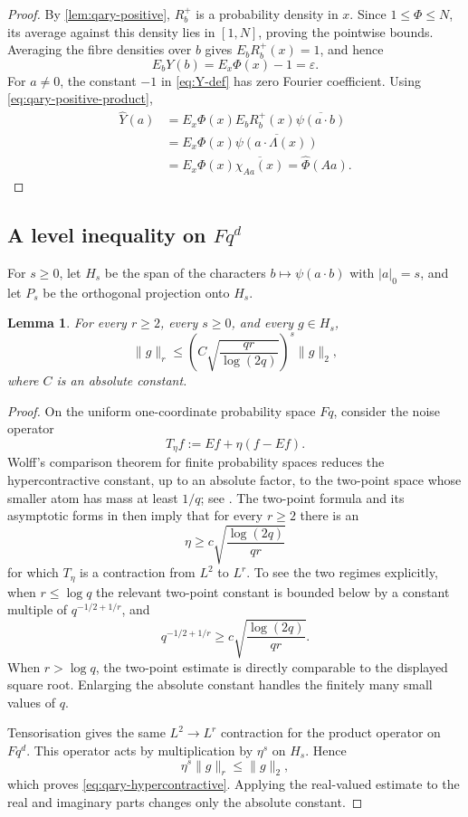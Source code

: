 \documentclass[11pt,reqno]{amsart}
\numberwithin{equation}{section}
\newtheorem{lemma}[lemma]{Lemma}
\theoremstyle{definition}
\theoremstyle{remark}
\newcommand{\Fq}{\mathbb F_q}
\newcommand{\E}{\mathbb E}
\newcommand{\eps}{\varepsilon}
\newcommand{\wh}{\widehat}
\newcommand{\norm}[1]{\lVert#1\rVert}
\def\Fq{Fq}%
\def\mathbb#1{#1}%
\begin{document}
\begin{proof}
By \cref{lem:qary-positive}, $R_b^+$ is a probability density in $x$.  Since $1\le\Phi\le N$, its average against this density lies in $[1,N]$, proving the pointwise bounds.  Averaging the fibre densities over $b$ gives
$\E_bR_b^+(x)=1$, and hence
\[
 \E_bY(b)=\E_x\Phi(x)-1=\eps.
\]
For $a\ne0$, the constant $-1$ in \eqref{eq:Y-def} has zero Fourier coefficient.  Using \eqref{eq:qary-positive-product},
\begin{align*}
 \wh Y(a)
 &=\E_x\Phi(x)
   \E_bR_b^+(x)\overline{\psi(a\cdot b)}\\
 &=\E_x\Phi(x)\overline{\psi(a\cdot\Lambda(x))}\\
 &=\E_x\Phi(x)\overline{\chi_{Aa}(x)}
 =\wh\Phi(Aa).
\end{align*}
\end{proof}

\subsection{A level inequality on $\Fq^d$}

For $s\ge0$, let $H_s$ be the span of the characters
$b\mapsto\psi(a\cdot b)$ with $|a|_0=s$, and let $P_s$ be the orthogonal projection onto $H_s$.

\begin{lemma}\label{lem:qary-hypercontractive}
For every $r\ge2$, every $s\ge0$, and every $g\in H_s$,
\begin{equation}\label{eq:qary-hypercontractive}
 \norm g_r
 \le
 \left(
   C\sqrt{\frac{qr}{\log(2q)}}
 \right)^s
 \norm g_2,
\end{equation}
where $C$ is an absolute constant.
\end{lemma}

\begin{proof}
On the uniform one-coordinate probability space $\Fq$, consider the noise operator
\[
 T_\eta f:=\E f+\eta(f-\E f).
\]
Wolff's comparison theorem for finite probability spaces reduces the hypercontractive constant, up to an absolute factor, to the two-point space whose smaller atom has mass at least $1/q$; see \cite[Theorem~3.1]{Wolff}.  The two-point formula and its asymptotic forms in \cite[p.~221]{Wolff} then imply that for every $r\ge2$ there is an
\[
 \eta\ge c\sqrt{\frac{\log(2q)}{qr}}
\]
for which $T_\eta$ is a contraction from $L^2$ to $L^r$.  To see the two regimes explicitly, when $r\le\log q$ the relevant two-point constant is bounded below by a constant multiple of
$q^{-1/2+1/r}$, and
\[
 q^{-1/2+1/r}
 \ge c\sqrt{\frac{\log(2q)}{qr}}.
\]
When $r>\log q$, the two-point estimate is directly comparable to the displayed square root.  Enlarging the absolute constant handles the finitely many small values of $q$.

Tensorisation gives the same $L^2\to L^r$ contraction for the product operator on $\Fq^d$.  This operator acts by multiplication by $\eta^s$ on $H_s$.  Hence
\[
 \eta^s\norm g_r\le\norm g_2,
\]
which proves \eqref{eq:qary-hypercontractive}.  Applying the real-valued estimate to the real and imaginary parts changes only the absolute constant.
\end{proof}
\end{document}
